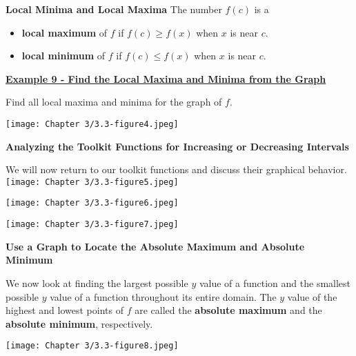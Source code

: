 \documentclass[12pt]{book}
\begin{document}
\newpage



\begin{boxR}
    \textbf{Local Minima and Local Maxima}
    \vspace{1mm}
    \hline
    \vspace{2mm}
The number $f(c)$ is a 
\begin{itemize}
    \item \textbf{local maximum} of $f$ if $f(c) \geq f(x)$ when $x$ is near $c$.
     \item \textbf{local minimum} of $f$ if $f(c) \leq f(x)$ when $x$ is near $c$.
\end{itemize}
\end{boxR}
\vspace{1mm}


\underline{\textbf{Example 9 - Find the Local Maxima and Minima from the Graph}}

Find all local maxima and minima for the graph of $f$.

\texttt{[image: Chapter 3/3.3-figure4.jpeg]}

\vspace{3mm}
{\large \textbf{Analyzing the Toolkit Functions for Increasing or Decreasing Intervals}}

We will now return to our toolkit functions and discuss their graphical behavior.
\\

\texttt{[image: Chapter 3/3.3-figure5.jpeg]}

\newpage


\texttt{[image: Chapter 3/3.3-figure6.jpeg]}

\texttt{[image: Chapter 3/3.3-figure7.jpeg]}


\newpage


\textbf{\large Use a Graph to Locate the Absolute Maximum and Absolute Minimum}

We now look at finding the largest possible $y$ value of a function and the smallest possible $y$ value of a function throughout its entire domain. The $y$ value of the highest and lowest points of $f$ are called the \textbf{ absolute maximum} and the \textbf{absolute minimum}, respectively.
\\ 

\centerline{\texttt{[image: Chapter 3/3.3-figure8.jpeg]}}

\vspace{5mm}
\end{document}
